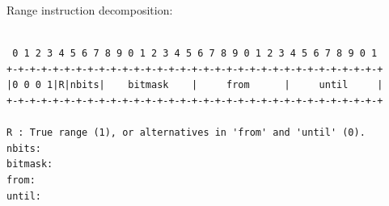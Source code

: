 Range instruction decomposition:

\begin{myquote}
\begin{verbatim}

 0 1 2 3 4 5 6 7 8 9 0 1 2 3 4 5 6 7 8 9 0 1 2 3 4 5 6 7 8 9 0 1
+-+-+-+-+-+-+-+-+-+-+-+-+-+-+-+-+-+-+-+-+-+-+-+-+-+-+-+-+-+-+-+-+
|0 0 0 1|R|nbits|    bitmask    |     from      |     until     |
+-+-+-+-+-+-+-+-+-+-+-+-+-+-+-+-+-+-+-+-+-+-+-+-+-+-+-+-+-+-+-+-+

R : True range (1), or alternatives in 'from' and 'until' (0).
nbits:
bitmask:
from:
until:

\end{verbatim}
\end{myquote}
